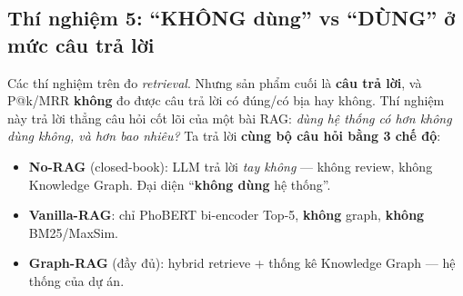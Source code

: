 \documentclass[12pt,a4paper]{article}
\begin{document}
\subsection{Thí nghiệm 5: ``KHÔNG dùng'' vs ``DÙNG'' ở mức câu trả lời}
\label{sec:exp5}

Các thí nghiệm trên đo \textit{retrieval}. Nhưng sản phẩm cuối là \textbf{câu trả lời}, và P@k/MRR \textbf{không} đo được câu trả lời có đúng/có bịa hay không. Thí nghiệm này trả lời thẳng câu hỏi cốt lõi của một bài RAG: \textit{dùng hệ thống có hơn không dùng không, và hơn bao nhiêu?} Ta trả lời \textbf{cùng bộ câu hỏi bằng 3 chế độ}:

\begin{itemize}[leftmargin=1.5cm,itemsep=1pt]
  \item \textbf{No-RAG} (closed-book): LLM trả lời \textit{tay không} --- không review, không Knowledge Graph. Đại diện ``\textbf{không dùng} hệ thống''.
  \item \textbf{Vanilla-RAG}: chỉ PhoBERT bi-encoder Top-5, \textbf{không} graph, \textbf{không} BM25/MaxSim.
  \item \textbf{Graph-RAG} (đầy đủ): hybrid retrieve + thống kê Knowledge Graph --- hệ thống của dự án.
\end{itemize}
\end{document}
